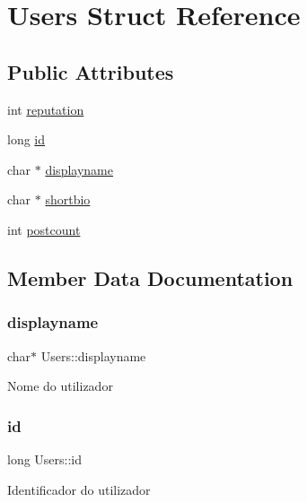 \hypertarget{structUsers}{}\section{Users Struct Reference}
\label{structUsers}
\subsection*{Public Attributes}
\begin{DoxyCompactItemize}
\item 
int \hyperlink{structUsers_ae38c9ce8c1d3490cb9cb354f16363081}{reputation}
\item 
long \hyperlink{structUsers_a24d296bcca91dd989df910bb4a345818}{id}
\item 
char $\ast$ \hyperlink{structUsers_a2226861aea79a479d71a47f678cede4e}{displayname}
\item 
char $\ast$ \hyperlink{structUsers_acfa48f1fdcd5f32884c5455a99460459}{shortbio}
\item 
int \hyperlink{structUsers_a7fbe0d4826a63c0b4e0a9c57cdfbd8f0}{postcount}
\end{DoxyCompactItemize}


\subsection{Member Data Documentation}
\mbox{\label{structUsers_a2226861aea79a479d71a47f678cede4e}} 
\subsubsection{\texorpdfstring{displayname}{displayname}}
{\footnotesize\ttfamily char$\ast$ Users\+::displayname}

Nome do utilizador \mbox{\label{structUsers_a24d296bcca91dd989df910bb4a345818}} 
\subsubsection{\texorpdfstring{id}{id}}
{\footnotesize\ttfamily long Users\+::id}

Identificador do utilizador \mbox{\label{structUsers_a7fbe0d4826a63c0b4e0a9c57cdfbd8f0}} 
